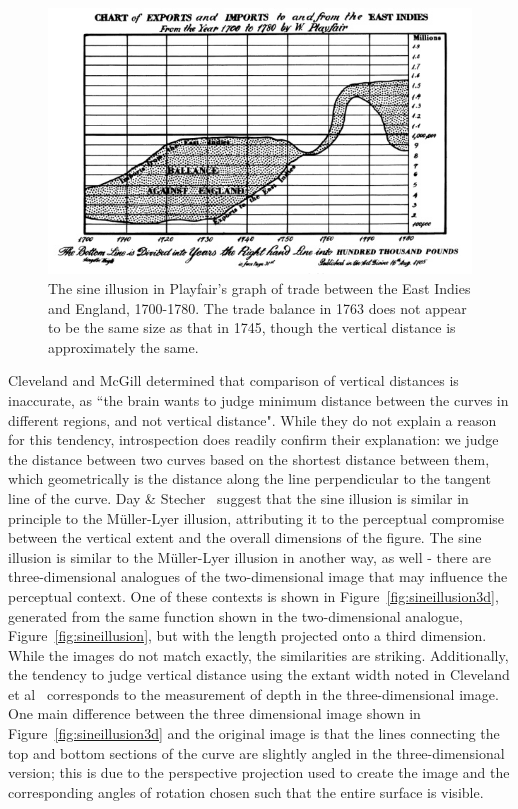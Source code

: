 \documentclass[journal]{vgtc}\usepackage{graphicx, color}
\begin{document}
\begin{figure}[h!t]\centering
\includegraphics[keepaspectratio=TRUE,width=\linewidth]{images/PlayfairExportImports}
\caption{The sine illusion in Playfair's graph of trade between the East Indies and England, 1700-1780. The trade balance in 1763 does not appear to be the same size as that in 1745, though the vertical distance is approximately the same.}\label{fig:playfair}
\end{figure}
Cleveland and McGill
\citep{cleveland:1984} determined that comparison of vertical distances is inaccurate, as ``the brain wants to judge minimum distance between the curves in different regions, and not vertical distance". While they do not explain a reason for this tendency, introspection does readily confirm their explanation: we judge the distance between two curves based on the shortest distance between them, which geometrically is the distance along the line perpendicular to the tangent line of the curve. Day \& Stecher~\citep{day:1991} suggest that the sine illusion is similar in principle to the M\"uller-Lyer illusion, attributing it to the perceptual compromise between the vertical extent and the overall dimensions of the figure. The sine illusion is similar to the  M\"uller-Lyer illusion in another way, as well - there are three-dimensional analogues of the two-dimensional image that may influence the perceptual context. One of these contexts is shown in Figure~\ref{fig:sineillusion3d}, generated from the same function shown in the two-dimensional analogue, Figure~\ref{fig:sineillusion}, but with the length projected onto a third dimension. While the images do not match exactly, the similarities are striking. Additionally, the tendency to judge vertical distance using the extant width noted in Cleveland et al~\citep{cleveland:1985} corresponds to the measurement of depth in the three-dimensional image. One main difference between the three dimensional image shown in Figure~\ref{fig:sineillusion3d} and the original image is that the lines connecting the top and bottom sections of the curve are slightly angled in the three-dimensional version; this is due to the perspective projection used to create the image and the corresponding angles of rotation chosen such that the entire surface is visible. 
\end{document}
